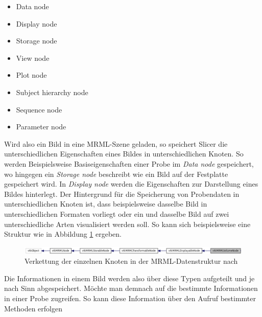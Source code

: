 \begin{minipage}{0.45\textwidth}
	\begin{itemize}
		\item Data node

		\item Display node

		\item Storage node

		\item View node
	\end{itemize}
\end{minipage}
\hfill
\begin{minipage}{0.45\textwidth}
	\begin{itemize}
		\item Plot node

		\item Subject hierarchy node

		\item Sequence node

		\item Parameter node
	\end{itemize}
\end{minipage}

Wird also ein Bild in eine \ac{MRML}-Szene geladen, so speichert Slicer die
unterschiedlichen Eigenschaften eines Bildes in unterschiedlichen Knoten. So werden
Beispielsweise Basiseigenschaften einer Probe im \textit{Data node} gespeichert,
wo hingegen ein \textit{Storage node} beschreibt wie ein Bild auf der Festplatte
gespeichert wird. In \textit{Display node} werden die Eigenschaften zur
Darstellung eines Bildes hinterlegt. Der Hintergrund für die Speicherung von Probendaten
in unterschiedlichen Knoten ist, dass beispielsweise dasselbe Bild in
unterschiedlichen Formaten vorliegt oder ein und dasselbe Bild auf zwei
unterschiedliche Arten visualisiert werden soll. So kann sich beispielsweise eine
Struktur wie in Abbildung \ref{fig:3d_slicer_class} ergeben.

\begin{figure}[h]
	\centering
	\includegraphics[width=1\textwidth]{img/slicer_class_index.jpg}
	\caption{Verkettung der einzelnen Knoten in der MRML-Datenstruktur nach
	\cite{slicer2024}}
	\label{fig:3d_slicer_class}
\end{figure}

Die Informationen in einem Bild werden also über diese Typen aufgeteilt und je
nach Sinn abgespeichert. Möchte man demnach auf die bestimmte Informationen in einer
Probe zugreifen. So kann diese Information über den Aufruf bestimmter Methoden
erfolgen

